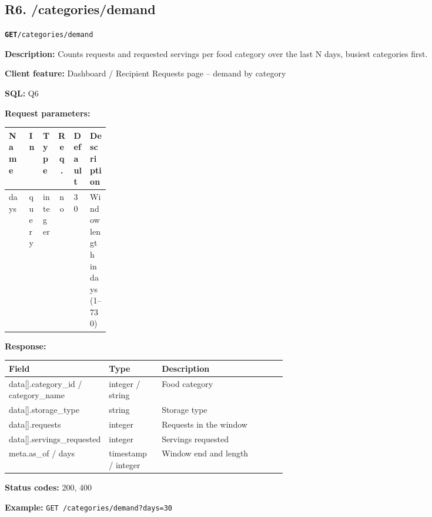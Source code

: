 \documentclass[11pt,letterpaper]{article}
\newcommand{\brk}{\penalty0\relax}
\newcommand{\routebar}[2]{%
  \par\noindent\colorbox{boxGray}{\parbox{\dimexpr\linewidth-2\fboxsep}{%
  \strut\textbf{\texttt{#1}}\quad\texttt{#2}\strut}}\par\smallskip}
\newcommand{\kv}[2]{\textbf{#1:} #2\par}
\begin{document}
\subsection*{R6. /categories/demand}
\routebar{GET}{/categories/demand}
\kv{Description}{Counts requests and requested servings per food category over the last N days, busiest categories first.}
\kv{Client feature}{Dashboard / Recipient Requests page -- demand by category}
\kv{SQL}{Q6}
\kv{Request parameters}{}
\begin{xltabular}{\linewidth}{>{\ttfamily\raggedright\arraybackslash}p{0.2\linewidth} l l c l >{\raggedright\arraybackslash}X}
\toprule
\textrm{\textbf{Name}} & \textbf{In} & \textbf{Type} & \textbf{Req.} & \textbf{Default} & \textbf{Description} \\
\midrule
days & query & integer & no & 30 & Window length in days (1--730) \\
\bottomrule
\end{xltabular}
\kv{Response}{}
\begin{xltabular}{\linewidth}{>{\ttfamily\raggedright\arraybackslash}p{0.36\linewidth} >{\raggedright\arraybackslash}p{0.19\linewidth} >{\raggedright\arraybackslash}X}
\toprule
\textrm{\textbf{Field}} & \textbf{Type} & \textbf{Description} \\
\midrule
data[].\brk{}category\_id /\brk{} category\_name & integer / string & Food category \\
data[].\brk{}storage\_type & string & Storage type \\
data[].\brk{}requests & integer & Requests in the window \\
data[].\brk{}servings\_requested & integer & Servings requested \\
meta.\brk{}as\_of /\brk{} days & timestamp / integer & Window end and length \\
\bottomrule
\end{xltabular}
\kv{Status codes}{200, 400}
{\raggedright\textbf{Example:} {\small \texttt{GET /\brk{}categories/\brk{}demand?\brk{}days=\brk{}30}}\par}
\end{document}
